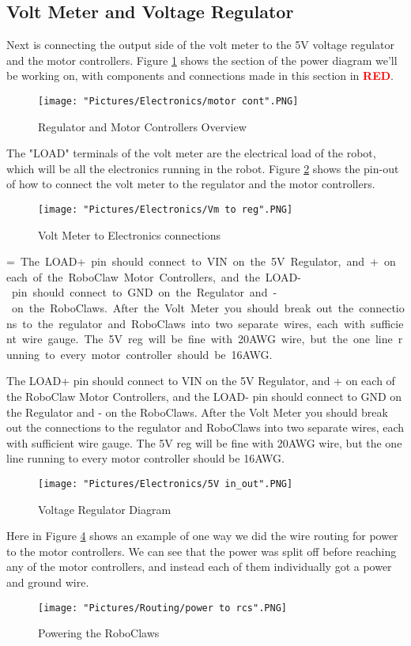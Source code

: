 \documentclass[12pt]{article}
\makeatletter
\newcommand{\mybox}[1]{%
  \setbox0=\hbox{#1}%
  \setlength{\@tempdima}{\dimexpr\wd0+13pt}%
  \begin{tcolorbox}[colframe=mycolor,boxrule=0.5pt,arc=4pt,
      left=6pt,right=6pt,top=6pt,bottom=6pt,boxsep=0pt,width=0.95\textwidth]
    #1
  \end{tcolorbox}
}
\makeatother
\begin{document}
\subsection{Volt Meter and Voltage Regulator}
Next is connecting the output side of the volt meter to the 5V voltage regulator and the motor controllers. Figure \ref{motor cont} shows the section of the power diagram we'll be working on, with components and connections made in this section in \textcolor{red}{\textbf{RED}}.

\begin{figure}[H]
  	\centering
    	\texttt{[image: "Pictures/Electronics/motor cont".PNG]}
 	\caption{Regulator and Motor Controllers Overview}
	\label{motor cont}
\end{figure}


The "LOAD" terminals of the volt meter are the electrical load of the robot, which will be all the electronics running in the robot. Figure \ref{vm sch} shows the pin-out of how to connect the volt meter to the regulator and the motor controllers.

\begin{figure}[H]
  	\centering
    	\texttt{[image: "Pictures/Electronics/Vm to reg".PNG]}
 	\caption{Volt Meter to Electronics connections}
	\label{vm sch}
\end{figure}

\mybox{
\noindent  The LOAD+ pin should connect to VIN on the 5V Regulator, and + on each of the RoboClaw Motor Controllers, and the LOAD- pin should connect to GND on the Regulator and - on the RoboClaws. After the Volt Meter you should break out the connections to the regulator and RoboClaws into two separate wires, each with sufficient wire gauge. The 5V reg will be fine with 20AWG wire, but the one line running to every motor controller should be 16AWG.  
}

\begin{figure}[H]
  	\centering
    	\texttt{[image: "Pictures/Electronics/5V in\_out".PNG]}
 	\caption{Voltage Regulator Diagram}
	\label{regs}
\end{figure}

\noindent Here in Figure \ref{vm2rcs} shows an example of one way we did the wire routing for power to the motor controllers. We can see that the power was split off before reaching any of the motor controllers, and instead each of them individually got a power and ground wire. 

\begin{figure}[H]
  	\centering
    	\texttt{[image: "Pictures/Routing/power to rcs".PNG]}
 	\caption{Powering the RoboClaws}
	\label{vm2rcs}
\end{figure}
\end{document}
